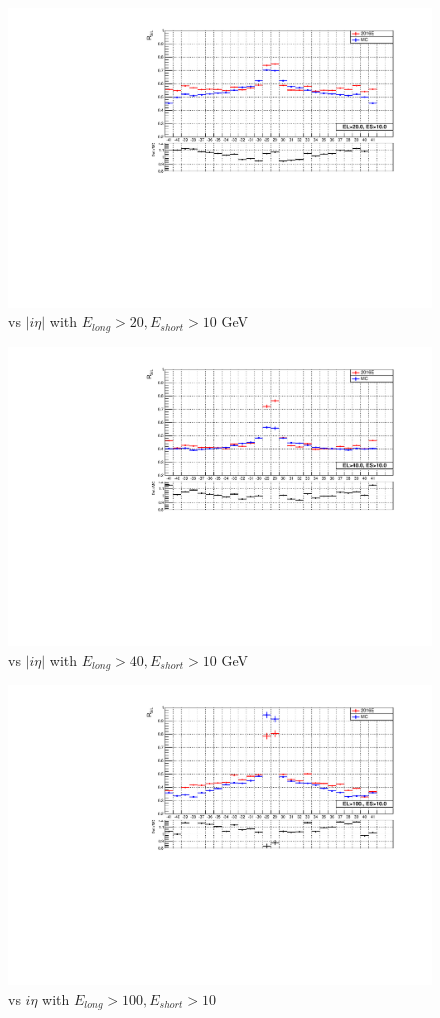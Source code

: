 \begin{figure}[h!]
\centering
\includegraphics[width=0.6\linewidth]{../Figures/Chap2/ImageFiles_HF/Ratio/DataMC/DataMCRIeta2010}
\caption{\ratiosl vs $|i\eta|$ with $E_{long}>20,E_{short}>10$ GeV}
\label{fig:DataMCRIeta2010}
\end{figure}
\begin{figure}[h!]
\centering
\includegraphics[width=0.6\linewidth]{../Figures/Chap2/ImageFiles_HF/Ratio/DataMC/DataMCRIeta4010}
\caption{\ratiosl vs $|i\eta|$ with $E_{long}>40,E_{short}>10$ GeV}
\label{fig:DataMCRIeta4010}
\end{figure}

\begin{figure}[h!]
\centering
\includegraphics[width=0.6\linewidth]{../Figures/Chap2/ImageFiles_HF/Ratio/DataMC/DataMCRIeta10010}
\caption{\ratiosl vs $i\eta$ with $E_{long}>100,E_{short}>10$}
\label{fig:DataMCRIeta10010}
\end{figure}

